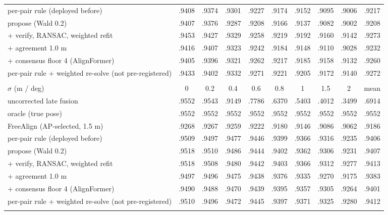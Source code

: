 \begin{table}[t]
\begin{tabular}{lccccccccc}
    \midrule
    per-pair rule (deployed before) & .9408 & .9374 & .9301 & .9227 & .9174 & .9152 & .9095 & .9006 & .9217 \\
    propose (Wald 0.2) & .9407 & .9376 & .9287 & .9208 & .9166 & .9137 & .9082 & .9002 & .9208 \\
    + verify, RANSAC, weighted refit & .9453 & .9427 & .9329 & .9258 & .9219 & .9192 & .9160 & .9142 & .9273 \\
    + agreement 1.0 m & .9416 & .9407 & .9323 & .9242 & .9184 & .9148 & .9110 & .9028 & .9232 \\
    + consensus floor 4 (AlignFormer) & .9405 & .9396 & .9321 & .9262 & .9217 & .9185 & .9158 & .9132 & .9260 \\
    per-pair rule + weighted re-solve (not pre-registered) & .9433 & .9402 & .9332 & .9271 & .9221 & .9205 & .9172 & .9140 & .9272 \\
    \addlinespace
    \multicolumn{10}{l}{\textbf{AP@0.3}} \\
    $\sigma$ (m / deg) & 0 & 0.2 & 0.4 & 0.6 & 0.8 & 1 & 1.5 & 2 & mean \\
    \midrule
    uncorrected late fusion & .9552 & .9543 & .9149 & .7786 & .6370 & .5403 & .4012 & .3499 & .6914 \\
    oracle (true pose) & .9552 & .9552 & .9552 & .9552 & .9552 & .9552 & .9552 & .9552 & .9552 \\
    FreeAlign (AP-selected, 1.5 m) & .9268 & .9267 & .9259 & .9222 & .9180 & .9146 & .9086 & .9062 & .9186 \\
    \midrule
    per-pair rule (deployed before) & .9509 & .9497 & .9477 & .9446 & .9399 & .9366 & .9316 & .9235 & .9406 \\
    propose (Wald 0.2) & .9518 & .9510 & .9486 & .9444 & .9402 & .9362 & .9306 & .9231 & .9407 \\
    + verify, RANSAC, weighted refit & .9518 & .9508 & .9480 & .9442 & .9403 & .9366 & .9312 & .9277 & .9413 \\
    + agreement 1.0 m & .9497 & .9496 & .9475 & .9438 & .9376 & .9335 & .9270 & .9175 & .9383 \\
    + consensus floor 4 (AlignFormer) & .9490 & .9488 & .9470 & .9439 & .9395 & .9357 & .9305 & .9264 & .9401 \\
    per-pair rule + weighted re-solve (not pre-registered) & .9510 & .9496 & .9472 & .9445 & .9397 & .9371 & .9325 & .9280 & .9412 \\
    \addlinespace
    \bottomrule
  \end{tabular}
\end{table}
